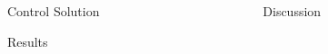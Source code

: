 \documentclass[final]{beamer}
\newlength{\sepwid}
\newlength{\onecolwid}
\newlength{\twocolwid}
\begin{document}
\begin{frame}[t]
\begin{columns}[t]
\begin{column}{\sepwid}\end{column} %

\begin{column}{\twocolwid} %


\begin{alertblock}{Control Solution\vspace{2pt}}

\end{alertblock}

\begin{alertblock}{Results\vspace{2pt}}
	
\end{alertblock} 

\end{column} %

\begin{column}{\sepwid}\end{column} %

\begin{column}{\onecolwid} %



\begin{alertblock}{Discussion\vspace{2pt}}
\centering
\vspace{.3cm}
\parbox{.95\textwidth}{

}\vspace{.3cm}
\end{alertblock}


\end{column}
\end{columns}
\end{frame}
\end{document}
